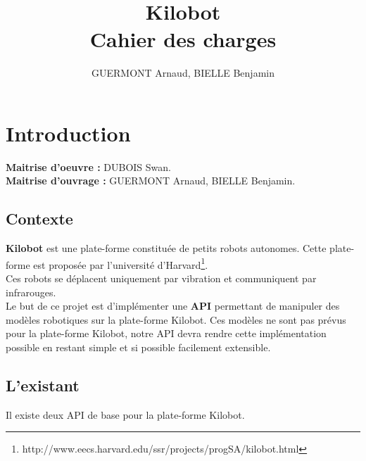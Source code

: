 \documentclass[a4paper,8pt]{report}
\title{{\LARGE Kilobot \\ Cahier des charges}}
\author{GUERMONT Arnaud, BIELLE Benjamin}
\begin{document}
\maketitle
\renewcommand{\contentsname}{Sommaire}
\tableofcontents

\chapter{Introduction}

\noindent \textbf{Maitrise d'oeuvre :} DUBOIS Swan.\\
\noindent \textbf{Maitrise d'ouvrage :} GUERMONT Arnaud, BIELLE Benjamin.\\

\section*{Contexte}\label{sec:name}

\textbf{Kilobot} est une plate-forme constitu\'ee de petits robots autonomes. Cette plate-forme est propos\'ee par l'universit\'e d'Harvard\footnote{http://www.eecs.harvard.edu/ssr/projects/progSA/kilobot.html}. \\
Ces robots se d\'eplacent uniquement par vibration et communiquent par infrarouges.\\

\smallskip
Le but de ce projet est d'impl\'ementer une \textbf{API} permettant de manipuler des mod\`eles robotiques sur la plate-forme Kilobot. Ces mod\`eles ne sont pas pr\'evus pour la plate-forme Kilobot, notre API devra rendre cette impl\'ementation possible en restant simple et si possible facilement extensible.\\

\section*{L'existant}\label{sec:name}

Il existe deux API de base pour la plate-forme Kilobot.\\
\end{document}
